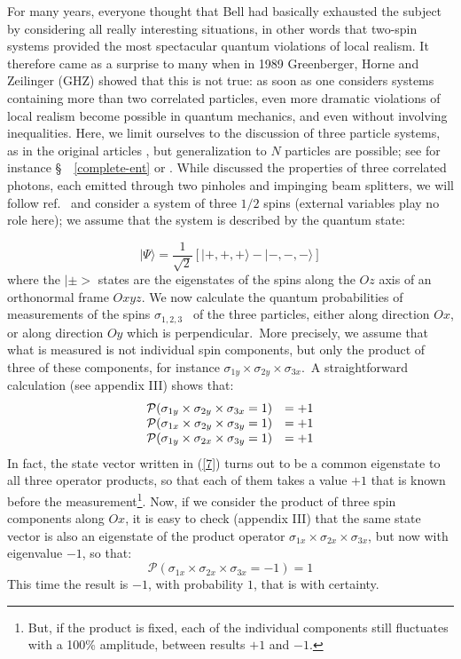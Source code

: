 \documentclass[12pt,onecolumn]{article}%
\begin{document}
For many years, everyone thought that Bell had basically exhausted the subject
by considering all really interesting situations, in other words that two-spin
systems provided the most spectacular quantum violations of local realism. It
therefore came as a surprise to many when in 1989 Greenberger, Horne and
Zeilinger (GHZ) showed that this is not true: as soon as one considers systems
containing more than two correlated particles, even more dramatic violations
of local realism become possible in quantum mechanics, and even without
involving inequalities. Here, we limit ourselves to the discussion of three
particle systems, as in the original articles \cite{GHZ} \cite{GHZ-bis}, but
generalization to $N$ particles are possible; see for instance
\S \ \ \ref{complete-ent} or \cite{FL2}. While \cite{GHZ-bis} discussed the
properties of three correlated photons, each emitted through two pinholes and
impinging beam splitters, we will follow ref.\ \cite{Mermin5} and consider a
system of three $1/2$ spins (external variables play no role here); we assume
that the system is described by the quantum state:%

\begin{equation}
|\Psi\rangle =\frac{1}{\sqrt{2}}\left[  |+,+,+\rangle -|-,-,-\rangle \right]  \label{7}%
\end{equation}
where the $|\pm>$ states are the eigenstates of the spins along the $Oz$
axis of an orthonormal frame $Oxyz$. We now calculate the quantum
probabilities of measurements of the spins $\sigma_{1,2,3}$ \ of the three
particles, either along direction $Ox$, or along direction $Oy$ which is
perpendicular.\ More precisely, we assume that what is measured is not
individual spin components, but only the product of three of these components,
for instance $\sigma_{1y}\times\sigma_{2y}\times\sigma_{3x}$.\ A
straightforward calculation (see appendix III) shows that:
\begin{equation}%
\begin{array}
[c]{ll}%
\mathcal{P}(\sigma_{1y}\times\sigma_{2y}\times\sigma_{3x}=1) & =+1\\
\mathcal{P}(\sigma_{1x}\times\sigma_{2y}\times\sigma_{3y}=1) & =+1\\
\mathcal{P}(\sigma_{1y}\times\sigma_{2x}\times\sigma_{3y}=1) & =+1
\end{array}
\label{8}%
\end{equation}
In fact, the state vector written in (\ref{7}) turns out to be a common
eigenstate to all three operator products, so that each of them takes a value
$+1$ that is known before the measurement\footnote{But, if the product is
fixed, each of the individual components still fluctuates with a 100\%
amplitude, between results $+1$ and $-1$.}. Now, if we consider the product of
three spin components along $Ox$, it is easy to check (appendix III) that the
same state vector is also an eigenstate of the product operator $\sigma
_{1x}\times\sigma_{2x}\times\sigma_{3x}$, but now with eigenvalue $-1$, so
that:
\begin{equation}
\mathcal{P}(\sigma_{1x}\times\sigma_{2x}\times\sigma_{3x}=-1)=1 \label{9}%
\end{equation}
This time the result is $-1$, with probability $1$, that is with certainty.
\end{document}
